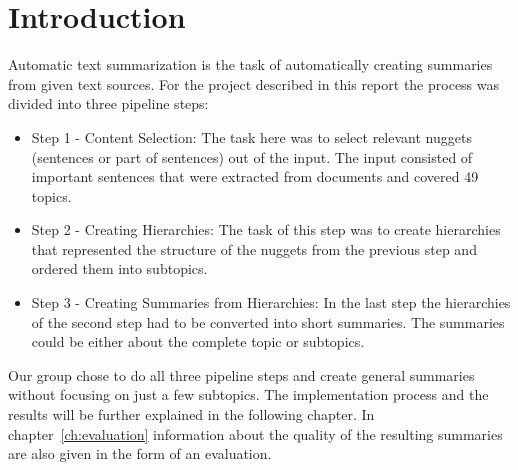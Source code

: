 
\section{Introduction}
Automatic text summarization is the task of automatically creating summaries from
given text sources. For the project described in this report the process was
divided into three pipeline steps:
\begin{itemize}
    \item Step 1 - Content Selection: The task here was to select relevant
        nuggets (sentences or part of sentences) out of the input. The
        input consisted of important sentences that were extracted from
        documents and covered 49 topics.
    \item Step 2 - Creating Hierarchies: The task of this step was to create
        hierarchies that represented the structure of the nuggets from the
        previous step and ordered them into subtopics.
    \item Step 3 - Creating Summaries from Hierarchies: In the last step the
        hierarchies of the second step had to be converted into short summaries.
        The summaries could be either about the complete topic or subtopics.
\end{itemize}
Our group chose to do all three pipeline steps and create general summaries
without focusing on just a few subtopics. The implementation process and
the results will be further explained in the following chapter. In
chapter~\ref{ch:evaluation} information about the quality of the resulting
summaries are also given in the form of an evaluation.